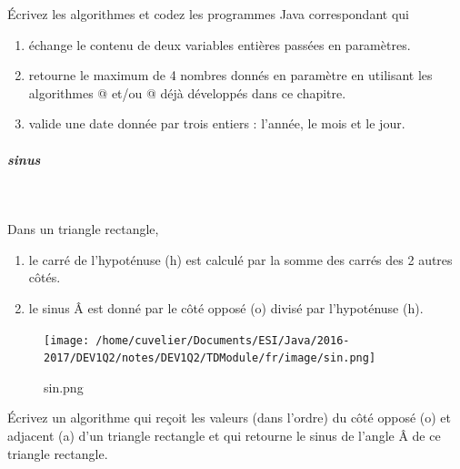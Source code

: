\documentclass[11pt,a4paper]{article}
\begin{document}
            \par
        
        \'Ecrivez les algorithmes et codez les programmes Java correspondant qui 
          
					\begin{enumerate}
				
			\item \'echange le contenu de deux variables enti\`eres pass\'ees en param\`etres.
            
			\item retourne le maximum de 4 nombres donn\'es en param\`etre en utilisant 
              les algorithmes @ et/ou @ d\'ej\`a d\'evelopp\'es dans ce chapitre.
			\item valide une date donn\'ee par trois entiers : l'ann\'ee, le mois et le jour.
					\end{enumerate}
				
            \par
        
			
		\subparagraph{sinus} 
		
					\textcolor{white}{.} \par
				
          Dans un triangle rectangle,
          
					\begin{enumerate}
				
			\item le carr\'e de l'hypot\'enuse (h) est calcul\'e par la somme des carr\'es des 2 autres c\^ot\'es.
			\item le sinus \^A est donn\'e par le c\^ot\'e oppos\'e (o) divis\'e par l'hypot\'enuse (h).
					\end{enumerate}
				\begin{figure}[hbt]
				    \begin{center}
					\texttt{[image: /home/cuvelier/Documents/ESI/Java/2016-2017/DEV1Q2/notes/DEV1Q2/TDModule/fr/image/sin.png]}
						\end{center}
                
                    \caption[sin.png]{sin.png}
                \end{figure}
                    
            \par
        
          \'Ecrivez un algorithme qui re\c coit les valeurs (dans l'ordre) du c\^ot\'e oppos\'e (o) et
          adjacent (a) d'un triangle rectangle et qui retourne le sinus de l'angle \^A de ce triangle rectangle.
        
            \par
        
				
\end{document}
